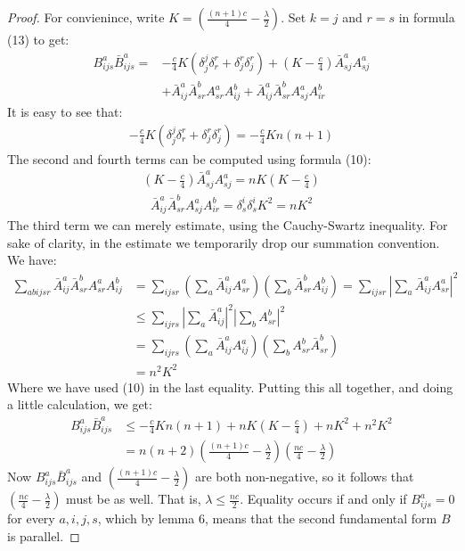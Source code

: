 \documentclass[11pt]{amsart}
\theoremstyle{definition}
\begin{document}
\begin{proof} For convienince, write $ K =\left( \frac{(n+1)c}{4} - \frac{\lambda}{2} \right)$.  Set $k = j$ and $r = s$ in formula (13) to get:
%
\begin{align*}
B^a_{ijs} \bar{B}^a_{ijs} =& -\frac{c}{4} K ( \delta^j_j \delta^r_r + \delta^r_j \delta^r_j ) + \left( K - \frac{c}{4} \right) \bar{A}^a_{sj} A^a_{sj} \\
&+ \bar{A}^a_{ij} \bar{A}^b_{sr} A^a_{sr} A^b_{ij} + \bar{A}^a_{ij} \bar{A}^b_{sr} A^a_{sj} A^b_{ir}
\end{align*}
%
It is easy to see that:
%
\begin{align*}
-\frac{c}{4} K ( \delta^j_j \delta^r_r + \delta^r_j \delta^r_j ) = -\frac{c}{4} K n (n+1)
\end{align*}
%
The second and fourth terms can be computed using formula (10):
%
\begin{align*}
\left( K - \frac{c}{4} \right) \bar{A}^a_{sj} A^a_{sj} = n K \left( K - \frac{c}{4} \right)
\end{align*}
%
\begin{align*}
\bar{A}^a_{ij} \bar{A}^b_{sr} A^a_{sj} A^b_{ir} = \delta^i_s \delta^i_s K^2 = n K^2
\end{align*}
%
The third term we can merely estimate, using the Cauchy-Swartz inequality.  For sake of clarity, in the estimate we temporarily drop our summation convention.  We have:
%
\begin{align*}
\sum_{abijsr} \bar{A}^a_{ij} \bar{A}^b_{sr} A^a_{sr} A^b_{ij} &= \sum_{ijsr} \left( \sum_{a} \bar{A}^a_{ij} A^a_{sr} \right)\left( \sum_{b} \bar{A}^b_{sr} A^b_{ij} \right) = \sum_{ijsr} \left| \sum_{a} \bar{A}^a_{ij} A^a_{sr} \right|^2 \\
&\leq \sum_{ijrs} \left| \sum_{a} \bar{A}^a_{ij} \right|^2 \left| \sum_{b}  A^b_{sr} \right|^2 \\
&= \sum_{ijrs} \left( \sum_{a} \bar{A}^a_{ij} A^a_{ij} \right) \left( \sum_{b}  A^b_{sr} \bar{A}^b_{sr} \right)\\
&= n^2 K^2
\end{align*}
%
Where we have used (10) in the last equality.  Putting this all together, and doing a little calculation, we get:
%
\begin{align*}
B^a_{ijs} \bar{B}^a_{ijs} &\leq -\frac{c}{4} K n(n+1) + n K \left( K - \frac{c}{4} \right) + n K^2 + n^2 K^2 \\
&= n(n+2) \left( \frac{(n+1)c}{4} - \frac{\lambda}{2} \right) \left( \frac{nc}{4} - \frac{\lambda}{2} \right)
\end{align*}
%
Now $B^a_{ijs} \bar{B}^a_{ijs}$ and $\left( \frac{(n+1)c}{4} - \frac{\lambda}{2} \right)$ are both non-negative, so it follows that $\left( \frac{nc}{4} - \frac{\lambda}{2} \right)$ must be as well.  That is, $\lambda \leq \frac{nc}{2}$.  Equality occurs if and only if $B^a_{ijs} = 0$ for every $a,i,j,s$, which by lemma 6, means that the second fundamental form $B$ is parallel.
\end{proof}
 
\end{document}
